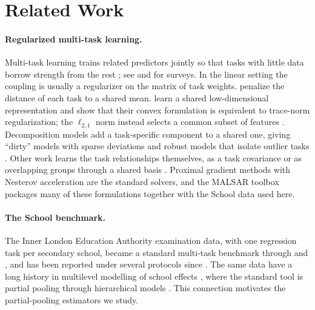 \section{Related Work}
\label{sec:related}

\paragraph{Regularized multi-task learning.}
Multi-task learning trains related predictors jointly so that tasks with little data borrow strength from the rest \citep{caruana1997multitask}; see \citet{zhang2022survey} and \citet{yu2024unleashing} for surveys. In the linear setting the coupling is usually a regularizer on the matrix of task weights. \citet{evgeniou2004regularized} penalize the distance of each task to a shared mean. \citet{argyriou2008convex} learn a shared low-dimensional representation and show that their convex formulation is equivalent to trace-norm regularization; the $\ell_{2,1}$ norm instead selects a common subset of features \citep{obozinski2010joint, liu2009multitask}. Decomposition models add a task-specific component to a shared one, giving ``dirty'' models with sparse deviations \citep{jalali2010dirty, chen2012incoherent} and robust models that isolate outlier tasks \citep{chen2011integrating}. Other work learns the task relationships themselves, as a task covariance \citep{zhang2010convex} or as overlapping groups through a shared basis \citep{kumar2012learning}. Proximal gradient methods with Nesterov acceleration \citep{beck2009fista, ji2009accelerated} are the standard solvers, and the MALSAR toolbox \citep{zhou2011malsar} packages many of these formulations together with the School data used here.

\paragraph{The School benchmark.}
The Inner London Education Authority examination data, with one regression task per secondary school, became a standard multi-task benchmark through \citet{bakker2003task} and \citet{evgeniou2005kernel}, and has been reported under several protocols since \citep{argyriou2008convex, zhang2010convex, kumar2012learning, li2019better}. The same data have a long history in multilevel modelling of school effects \citep{goldstein2011multilevel}, where the standard tool is partial pooling through hierarchical models \citep{gelman2007data}. This connection motivates the partial-pooling estimators we study.

